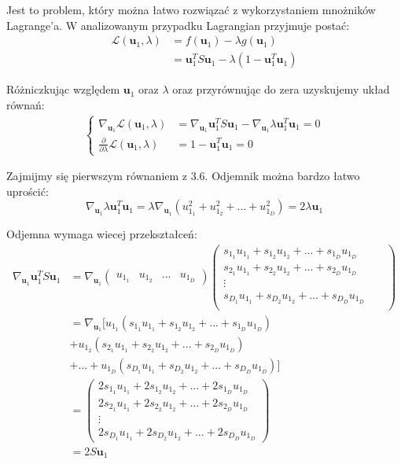 \documentclass[oneside, eng]{mgr}
\newcommand{\bb}{\textbf}
\begin{document}
Jest to problem, który można łatwo rozwiązać z wykorzystaniem mnożników Lagrange'a. W analizowanym przypadku Lagrangian przyjmuje postać:
\begin{align*}
	\mathcal{L}(\bb{u}_1, \lambda) &= f(\bb{u}_1) - \lambda g(\bb{u}_1) \\
				&= \bb{u}_1^T S \bb{u}_1 - \lambda(1 - \bb{u}_1^T \bb{u}_1)
\end{align*}

Różniczkując względem $\bb{u}_1$ oraz $\lambda$ oraz przyrównując do zera uzyskujemy układ równań:
\begin{align} 
\begin{cases}
	\nabla_{\bb{u}_1} \mathcal{L} (\bb{u}_1, \lambda) &= \nabla_{\bb{u}_1} \bb{u}_1^T S \bb{u}_1 - \nabla_{\bb{u}_1} \lambda \bb{u}_1^T \bb{u}_1 = 0 \\
	\frac{\partial}{\partial \lambda} \mathcal{L} (\bb{u}_1, \lambda) &= 1 - \bb{u}_1^T \bb{u}_1 = 0
\end{cases}
\end{align}

Zajmijmy się pierwszym równaniem z $3.6$. Odjemnik można bardzo łatwo uprościć:
\begin{equation}
	\nabla_{\bb{u}_1} \lambda \bb{u}_1^T \bb{u}_1 = \lambda \nabla_{\bb{u}_1} 
		(u_{1_1}^2 + u_{1_2}^2 + ... + u_{1_D}^2)
	 	= 2 \lambda \bb{u}_1
\end{equation}

Odjemna wymaga wiecej przekształceń:
\begin{align}
	\nabla_{\bb{u}_1} \bb{u}_1^T S \bb{u}_1 
	&= \nabla_{\bb{u}_1} 
	\left( \begin{array}{llll} u_{1_1} & u_{1_2} & ... & u_{1_D} \end{array} \right)
	\begin{pmatrix}
         s_{1_1} u_{1_1} + s_{1_2} u_{1_2} + ... + s_{1_D} u_{1_D}  \\
		 s_{2_1} u_{1_1} + s_{2_2} u_{1_2} + ... + s_{2_D} u_{1_D} && \\
		 \vdots     \\
		 s_{D_1} u_{1_1} + s_{D_2} u_{1_2} + ... + s_{D_D} u_{1_D} && \\
    \end{pmatrix} \\
    &= \nabla_{\bb{u}_1} [u_{1_1} (s_{1_1} u_{1_1} + s_{1_2} u_{1_2} + ... + s_{1_D} u_{1_D})  \\
    				&+ u_{1_2} (s_{2_1} u_{1_1} + s_{2_2} u_{1_2} + ... + s_{2_D} u_{1_D}) \nonumber \\
    				&+ ... + u_{1_D} (s_{D_1} u_{1_1} + s_{D_2} u_{1_2} + ... + s_{D_D} u_{1_D})] \nonumber \\
    &= \begin{pmatrix}
    	2 s_{1_1} u_{1_1} + 2 s_{1_2} u_{1_2} + ... + 2 s_{1_D} u_{1_D}  \\
    	2 s_{2_1} u_{1_1} + 2 s_{2_2} u_{1_2} + ... + 2 s_{2_D} u_{1_D}  \\
    	\vdots     \\
	    2 s_{D_1} u_{1_1} + 2 s_{D_2} u_{1_2} + ... + 2 s_{D_D} u_{1_D}
    \end{pmatrix} \\
    &= 2 S \bb{u}_1
\end{align}
\end{document}

